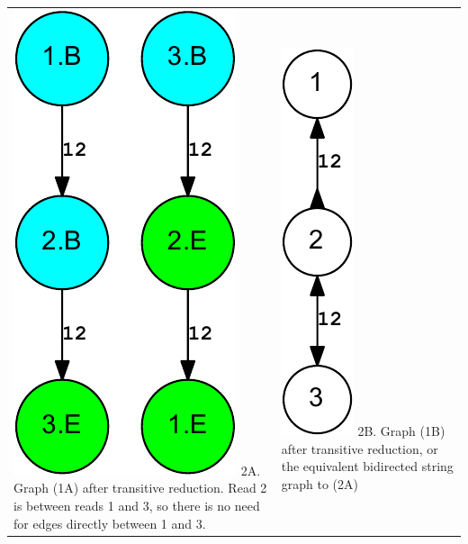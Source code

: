 \documentclass[letterpaper,12pt]{article}
\begin{document}
\begin{tabular}{|p{}|p{}|}
\centering
\includegraphics[scale=0.6]{out.reduced.digraph-crop.pdf}
\newline 2A. Graph (1A) after transitive reduction.  Read 2 is between reads 1
and 3, so there is no need for edges directly between 1 and 3.
&
\centering
\includegraphics[scale=0.7]{out.reduced.bidigraph-crop.pdf}
\newline 2B. Graph (1B) after transitive reduction, or the equivalent bidirected
string graph to (2A)


\end{tabular}
\end{document}
